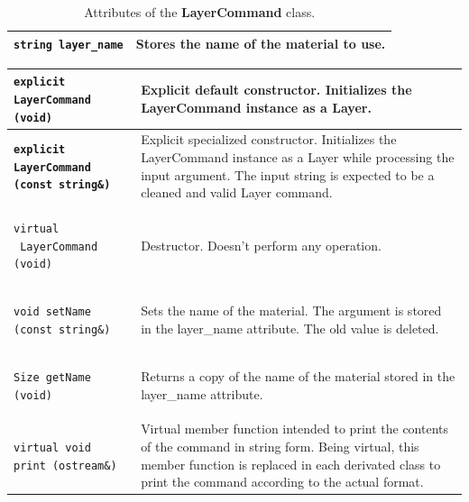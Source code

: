 \documentclass[11pt,twoside,openany,x11names,svgnames]{memoir}
\begin{document}
\begin{table}[h]\footnotesize
\centering
\begin{tabular}{| >{\bfseries}p{6.5cm} | p{9cm} |}
	\hline
	
	\texttt{string layer\_name} & Stores the name of the material to use. \\
	
	\hline
\end{tabular}
\caption{Attributes of the \textbf{LayerCommand} class.}
\label{tab:LayerCommand-Attributes}
\end{table}

\begin{table}[h]\footnotesize
\centering
\begin{tabular}{| >{\bfseries}p{8.5cm} | p{7cm} |}
	\hline
	
	\texttt{explicit LayerCommand (void)} & Explicit default constructor. Initializes the LayerCommand instance as a Layer. \\
	
	\hline
	
	\texttt{explicit LayerCommand (const string\&)} & Explicit specialized constructor. Initializes the LayerCommand instance as a Layer while processing the input argument. The input string is expected to be a cleaned and valid Layer command. \\
	
	\hline
	
	\texttt{virtual ~LayerCommand (void)} & Destructor. Doesn't perform any operation. \\
	
	\hline
	
	\texttt{void setName (const string\&)} & Sets the name of the material. The argument is stored in the layer\_name attribute. The old value is deleted. \\
	
	\hline	
	
	\texttt{Size getName (void)} & Returns a copy of the name of the material stored in the layer\_name attribute. \\
		
	\hline
	
	\texttt{virtual void print (ostream\&)} & Virtual member function intended to print the contents of the command in string form. Being virtual, this member function is replaced in each derivated class to print the command according to the actual format. \\
	
	\hline
	

\end{tabular}
\end{table}
\end{document}

